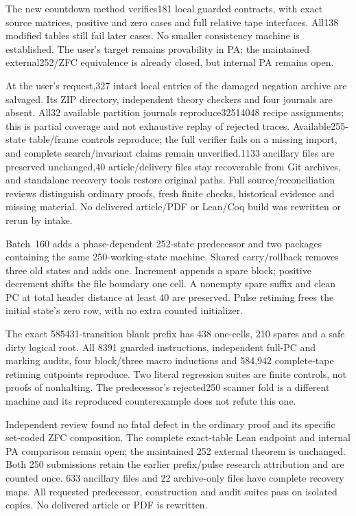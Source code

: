 \documentclass[11pt]{article}
\begin{document}
{The new countdown method verifies181 local guarded contracts, with exact source
matrices, positive and zero cases and full relative tape interfaces. All138
modified tables still fail later cases. No smaller consistency machine is
established. The user's target remains provability in PA; the maintained
external252/ZFC equivalence is already closed, but internal PA remains open.

At the user's request,327 intact local entries of the damaged negation archive
are salvaged. Its ZIP directory, independent theory checkers and four journals
are absent. All32 available partition journals reproduce32514048 recipe assignments; this
is partial coverage and not exhaustive replay of rejected traces.
Available255-state table/frame controls reproduce; the full verifier
fails on a missing import, and complete search/invariant claims remain
unverified.1133 ancillary files are preserved unchanged,40 article/delivery
files stay recoverable from Git archives, and standalone recovery tools restore
original paths. Full source/reconciliation reviews distinguish ordinary proofs,
fresh finite checks, historical evidence and missing material. No delivered
article/PDF or Lean/Coq build was rewritten or rerun by intake.

Batch~160 adds a phase-dependent 252-state predecessor and two packages
containing the same 250-working-state machine. Shared carry/rollback removes
three old states and adds one. Increment appends a spare block; positive
decrement shifts the file boundary one cell. A nonempty spare suffix and clean
PC at total header distance at least 40 are preserved. Pulse retiming frees the
initial state's zero row, with no extra counted initializer.

The exact 585431-transition blank prefix has 438 one-cells, 210 spares and a safe
dirty logical root. All 8391 guarded instructions, independent full-PC and
marking audits, four block/three macro inductions and 584,942 complete-tape
retiming cutpoints reproduce. Two literal regression suites are finite controls,
not proofs of nonhalting. The predecessor's rejected250 scanner fold is a
different machine and its reproduced counterexample does not refute this one.

Independent review found no fatal defect in the ordinary proof and its specific
set-coded ZFC composition. The complete exact-table Lean endpoint and internal PA
comparison remain open; the maintained 252 external theorem is unchanged.
Both 250 submissions retain the earlier prefix/pulse research attribution and
are counted once. 633 ancillary files and 22 archive-only files have complete
recovery maps. All requested predecessor, construction and audit suites pass
on isolated copies. No delivered article or PDF is rewritten.

}
\end{document}
